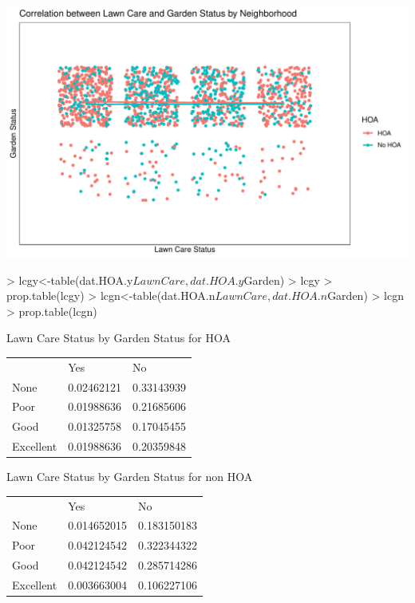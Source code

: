 \documentclass{article}
\begin{document}
\newpage

\includegraphics{exam1-017}

\begin{Schunk}
\begin{Sinput}
> lcgy<-table(dat.HOA.y$LawnCare,dat.HOA.y$Garden)
> lcgy
> prop.table(lcgy)
> lcgn<-table(dat.HOA.n$LawnCare,dat.HOA.n$Garden)
> lcgn
> prop.table(lcgn)
\end{Sinput}
\end{Schunk}

\begin{center} Lawn Care Status by Garden Status for HOA \end{center}
\begin{table}[H]
\begin{tabular}{lll}
          & Yes        & No         \\
None      & 0.02462121 & 0.33143939 \\
Poor      & 0.01988636 & 0.21685606 \\
Good      & 0.01325758 & 0.17045455 \\
Excellent & 0.01988636 & 0.20359848
\end{tabular}
\end{table}

\begin{center} Lawn Care Status by Garden Status for non HOA \end{center}
\begin{table}[H]
\begin{tabular}{lll}
          & Yes         & No          \\
None      & 0.014652015 & 0.183150183 \\
Poor      & 0.042124542 & 0.322344322 \\
Good      & 0.042124542 & 0.285714286 \\
Excellent & 0.003663004 & 0.106227106
\end{tabular}
\end{table}
\end{document}
